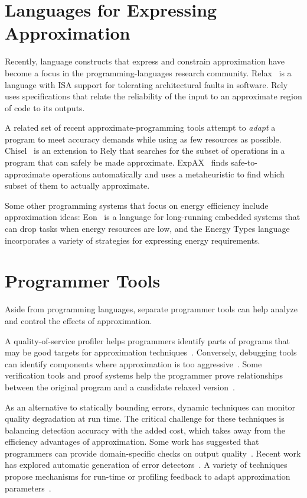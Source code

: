 \section{Languages for Expressing Approximation}

Recently, language constructs that express and constrain
approximation have become a focus in the programming-languages research
community.
Relax~\cite{relax} is a language with ISA support for tolerating architectural
faults in software.
Rely~\cite{rely} uses specifications that relate the reliability of the input
to an approximate region of code to its outputs.

A related set of recent approximate-programming tools attempt to \emph{adapt}
a program to meet accuracy demands while using as few resources as possible.
Chisel~\cite{chisel} is an extension to Rely that searches for the subset of
operations in a program that can safely be made approximate.
ExpAX~\cite{expax-tr} finds safe-to-approximate operations automatically and
uses a metaheuristic to find which subset of them to actually approximate.

Some other programming systems that focus on energy efficiency include
approximation ideas:
Eon~\cite{eon} is a language for long-running embedded systems that can drop
tasks when energy resources are low,
and the Energy Types language~\cite{energytypes} incorporates a variety of
strategies for expressing energy requirements.


\section{Programmer Tools}

Aside from programming languages, separate programmer tools can help analyze
and control the effects of approximation.

A quality-of-service profiler helps programmers identify parts of programs
that may be good targets for approximation techniques~\cite{qosprof}.
Conversely, debugging tools can identify components where approximation is too
aggressive~\cite{approxdebug}.
%
Some verification tools and proof systems help
the programmer prove relationships between the original program and a
candidate relaxed version~\cite{carbin-pldi, carbin-races, carbin-pepm,
rice-transformation-semantics}.

As an alternative to statically bounding errors, dynamic techniques can
monitor quality degradation at run time.
The critical challenge for these techniques is balancing detection accuracy
with the added cost, which takes away from the efficiency advantages of
approximation.
Some work has suggested that programmers can provide domain-specific checks on
output quality~\cite{lwc, approxdebug}.
Recent work has explored automatic generation of error detectors~\cite{rumba}.
A variety of techniques propose mechanisms for run-time or profiling feedback to adapt
approximation parameters~\cite{dynamicknobs, green, approxit, ansel-autotuning}.


